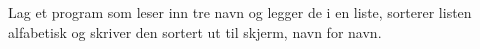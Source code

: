 %
%
Lag et program som leser inn tre navn og legger de i en liste, sorterer listen alfabetisk og skriver den sortert ut til skjerm, navn for navn.
